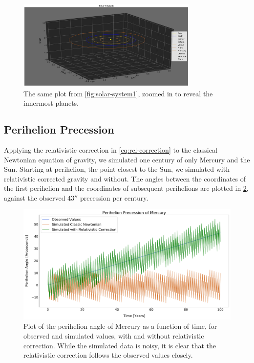 \documentclass[../main.tex]{subfiles}
\begin{document}
\begin{figure}[htb!]
    \centering
    \includegraphics[trim=5.cm 0.cm 0.cm 0.cm, clip,width=0.8\textwidth]{../figures/solar_system2.pdf}
    \caption{The same plot from \cref{fig:solar-system1}, zoomed in to reveal the innermost planets.}
    \label{fig:solar-system2}
\end{figure}

\subsection{Perihelion Precession}

Applying the relativistic correction in \cref{eq:rel-correction} to the classical Newtonian equation of gravity, we simulated one century of only Mercury and the Sun. Starting at perihelion, the point closest to the Sun, we simulated with relativistic corrected gravity and without. The angles between the coordinates of the first perihelion and the coordinates of subsequent perihelions are plotted in \cref{fig:perihelion-precession}, against the observed $43''$ precession per century.


\begin{figure}[htb!]
    \centering
    \includegraphics[width=1.0\textwidth]{../figures/3-10^7 perihelion.pdf}
    \caption{Plot of the perihelion angle of Mercury as a function of time, for observed and simulated values, with and without relativistic correction. While the simulated data is noisy, it is clear that the relativistic correction follows the observed values closely.}
    \label{fig:perihelion-precession}
\end{figure}
\end{document}
